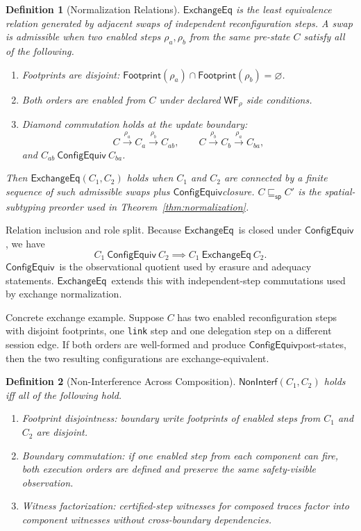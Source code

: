 \documentclass[a4paper,10pt,twocolumn,english]{article}
\numberwithin{equation}{section}
\theoremstyle{paperdef}
\newtheorem{definition}{Definition}[section]
\theoremstyle{paperplain}
\theoremstyle{paperdef}
\theoremstyle{paperremark}
\theoremstyle{paperdef}
\newcommand{\ConfigEquiv}{\ensuremath{\mathsf{ConfigEquiv}}}
\newcommand{\ExchangeEq}{\ensuremath{\mathsf{ExchangeEq}}}
\begin{document}
\begin{definition}[Normalization Relations]
	$\ExchangeEq$ is the least equivalence relation generated by adjacent swaps of independent reconfiguration steps. A swap is admissible when two enabled steps $\rho_a,\rho_b$ from the same pre-state $C$ satisfy all of the following.
	\begin{enumerate}
		\item Footprints are disjoint:
		      $\mathsf{Footprint}(\rho_a)\cap\mathsf{Footprint}(\rho_b)=\varnothing$.
		\item Both orders are enabled from $C$ under declared $\mathsf{WF}_\rho$ side conditions.
		\item Diamond commutation holds at the update boundary:
		      \[
			      C \xrightarrow{\rho_a} C_a \xrightarrow{\rho_b} C_{ab},
			      \qquad
			      C \xrightarrow{\rho_b} C_b \xrightarrow{\rho_a} C_{ba},
		      \]
		      and $C_{ab}\ \ConfigEquiv\ C_{ba}$.
	\end{enumerate}
	Then $\ExchangeEq(C_1,C_2)$ holds when $C_1$ and $C_2$ are connected by a finite sequence of such admissible swaps plus \ConfigEquiv closure.
	$C \sqsubseteq_{\mathsf{sp}} C'$ is the spatial-subtyping preorder used in Theorem~\ref{thm:normalization}.
\end{definition}

Relation inclusion and role split. Because \ExchangeEq\ is closed under
\ConfigEquiv, we have
\[
	C_1\ \ConfigEquiv\ C_2 \implies C_1\ \ExchangeEq\ C_2.
\]
\ConfigEquiv\ is the observational quotient used by erasure and adequacy
statements. \ExchangeEq\ extends this with independent-step commutations used by
exchange normalization.

Concrete exchange example. Suppose $C$ has two enabled reconfiguration steps with disjoint footprints, one \texttt{link} step and one delegation step on a different session edge. If both orders are well-formed and produce \ConfigEquiv post-states, then the two resulting configurations are exchange-equivalent.

\begin{definition}[Non-Interference Across Composition]
	$\mathsf{NonInterf}(C_1,C_2)$ holds iff all of the following hold.
	\begin{enumerate}
		\item Footprint disjointness: boundary write footprints of enabled steps from $C_1$ and $C_2$ are disjoint.
		\item Boundary commutation: if one enabled step from each component can fire, both execution orders are defined and preserve the same safety-visible observation.
		\item Witness factorization: certified-step witnesses for composed traces factor into component witnesses without cross-boundary dependencies.
	\end{enumerate}
\end{definition}
\end{document}
